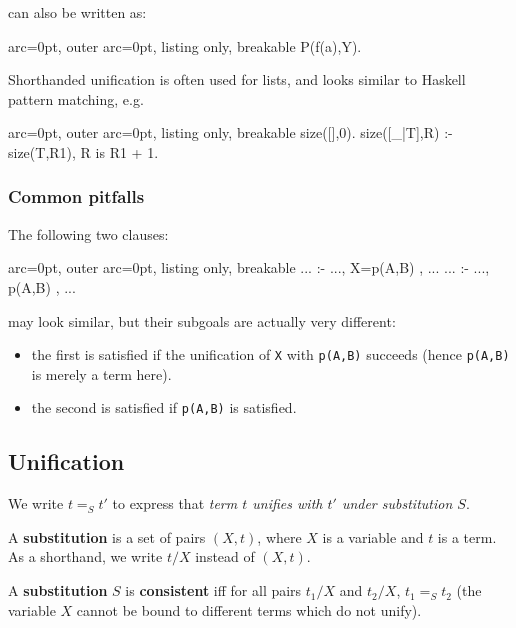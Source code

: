 can also be written as:

\begin{tcblisting}{ arc=0pt, outer arc=0pt, listing only, breakable}
P(f(a),Y).

\end{tcblisting}


Shorthanded unification is often used for lists, and looks similar to Haskell pattern matching, e.g.

\begin{tcblisting}{ arc=0pt, outer arc=0pt, listing only, breakable}
size([],0).
size([_|T],R) :- size(T,R1), R is R1 + 1.

\end{tcblisting}


\subsubsection*{ Common pitfalls }

The following two clauses:


\begin{tcblisting}{ arc=0pt, outer arc=0pt, listing only, breakable}
... :- ..., X=p(A,B) , ...
... :- ..., p(A,B) , ...

\end{tcblisting}


may look similar, but their subgoals are actually very different:
\begin{itemize}
	\item  the first is satisfied if the unification of \texttt{X} with \texttt{p(A,B)} succeeds (hence \texttt{p(A,B)} is merely a term here).
	\item  the second is satisfied if \texttt{p(A,B)} is satisfied.
\end{itemize}

\subsection*{ Unification }

We write $t =_S t'$ to express that \textit{term $t$ unifies with $t'$ under substitution $S$}.

A \textbf{substitution} is a set of pairs $(X,t)$, where $X$ is a variable and $t$ is a term. As a shorthand, we write $t/X$ instead of $(X,t)$.

A \textbf{substitution} $S$ is \textbf{consistent} iff for all pairs $t_1/X$ and $t_2/X$, $t_1 =_S t_2$ (the variable $X$ cannot be bound to different terms which do not unify).


